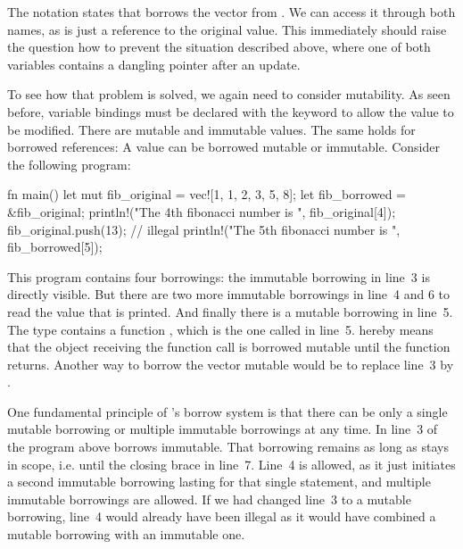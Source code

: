 The notation  states that  borrows the vector from .
We can access it through both names, as  is just a reference to the original value.
This immediately should raise the question how to prevent the situation described above, where one of both variables contains a dangling pointer after an update.

To see how that problem is solved, we again need to consider mutability.
As seen before, variable bindings must be declared with the  keyword to allow the value to be modified.
There are mutable and immutable values.
The same holds for borrowed references: A value can be borrowed mutable or immutable.
Consider the following program:

\begin{rustcode}
fn main() {
	let mut fib_original = vec![1, 1, 2, 3, 5, 8];
	let fib_borrowed = &fib_original;
	println!("The 4th fibonacci number is {}", fib_original[4]);
	fib_original.push(13); // illegal
	println!("The 5th fibonacci number is {}", fib_borrowed[5]);
}
\end{rustcode}

This program contains four borrowings: the immutable borrowing in line~3 is directly visible.
But there are two more immutable borrowings in line~4 and 6 to read the value that is printed.
And finally there is a mutable borrowing in line~5.
The type  contains a function , which is the one called in line~5.
 hereby means that the object receiving the function call is borrowed mutable until the function returns.
Another way to borrow the vector mutable would be to replace line~3 by .

One fundamental principle of \rust's borrow system is that there can be only a single mutable borrowing or multiple immutable borrowings at any time.
In line~3 of the program above  borrows  immutable.
That borrowing remains as long as  stays in scope, i.e. until the closing brace in line~7.
Line~4 is allowed, as it just initiates a second immutable borrowing lasting for that single statement, and multiple immutable borrowings are allowed.
If we had changed line~3 to a mutable borrowing, line~4 would already have been illegal as it would have combined a mutable borrowing with an immutable one.

